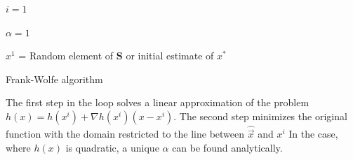 \documentclass[12pt,oneside,final]{thesis}\usepackage[]{graphicx}\usepackage[]{color}
\begin{document}
\begin{algorithm}[H]
 \SetAlgoLined
 $i=1$\;
 
 $\alpha=1$\;
 
 $x^1$ = Random element of   $\mathbf{S}$  or initial estimate of $\mathit{x^*}$ \;
 
 \caption{Frank-Wolfe algorithm}
\end{algorithm}

The first step in the loop solves a linear approximation of the problem $h(x)=h(x^i)+\nabla{h(x^i)}(x-x^i)$. The second step minimizes the original function with the domain restricted to the line between $\hat{\vec{x}}$ and $x^{i}$ In the case, where $h(x)$ is quadratic, a unique  $\hat{\alpha}$ can be found analytically.
\end{document}
